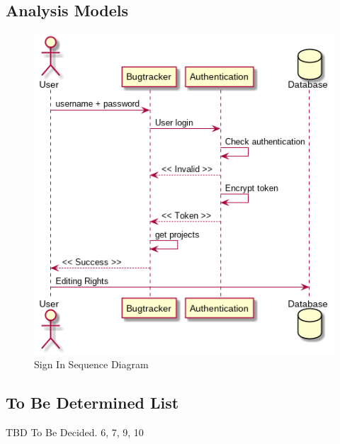 \documentclass{article}
\newcommand{\comment}[1]{}
\begin{document}
\printglossary

\subsection{Analysis Models}
\comment{
Optionally, include any pertinent analysis models, such as data flow diagrams, class diagrams, state-transition diagrams, or entity-relationship diagrams.
	}
\begin{figure}[h]
\caption{ Sign In Sequence Diagram }
\centering
\includegraphics[width=\textwidth]{sequence-diagram.png}
\end{figure}
\subsection{To Be Determined List}
\comment{
Collect a numbered list of the \acrshort{tbd} (to be determined) references in the \acrshort{srs} so they can be tracked for closure.
	}
TBD To Be Decided. 6, 7, 9, 10
\end{document}
